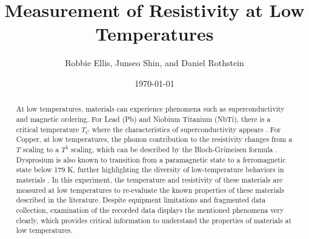 \documentclass[prl,twocolumn,superscriptaddress,floatfix]{revtex4}
\begin{document}
\title{Measurement of Resistivity at Low Temperatures}
\author{Robbie Ellis, Junseo Shin, and Daniel Rothstein}

\date{\today}

\begin{abstract}
    At low temperatures, materials can experience phenomena such as superconductivity and magnetic ordering. For Lead (Pb) and Niobium Titanium (NbTi), there is a critical temperature $T_C$ where the characteristics of superconductivity appears \cite{1062311}\cite{PhysRev.109.1094}.
    For Copper, at low temperatures, the phonon contribution to the resistivity changes from a $T$ scaling to a $T^5$ scaling, which can be described by the Bloch-Gr\"uneisen formula \cite{ZimanEP}. Dysprosium is also known to transition from a paramagnetic state to a ferromagnetic state below 179 K, further highlighting the diversity of low-temperature behaviors in
    materials \cite{Wilkinson1961-mk}.
    In this experiment, the temperature and resistivity of these materials are measured at low temperatures to re-evaluate the known properties of these materials described in the literature. %
    Despite equipment limitations and fragmented data collection, examination of the recorded data displays the mentioned phenomena very clearly, which
    provides critical information to understand the properties of materials at low temperatures.
\end{abstract}
\maketitle


\end{document}
